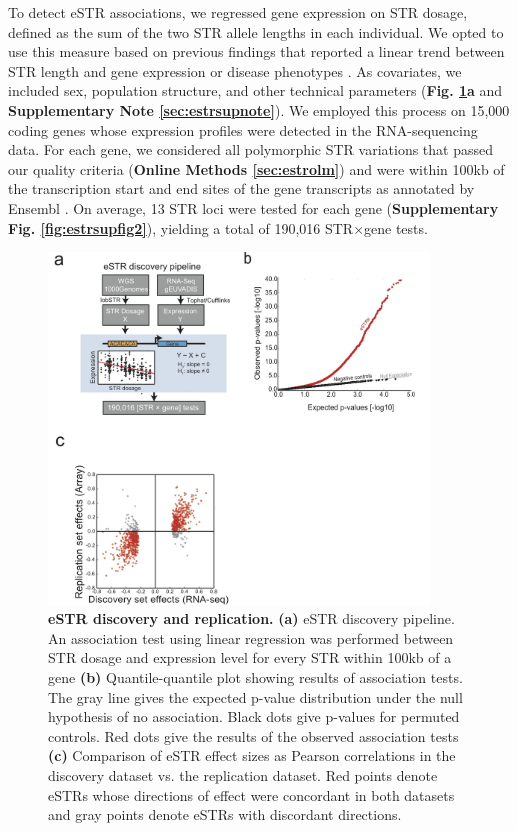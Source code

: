To detect eSTR associations, we regressed gene expression on STR dosage, defined as the sum of the two STR allele lengths in each individual. We opted to use this measure based on previous findings that reported a linear trend between STR length and gene expression \cite{GebhardtZankerBrandt1999,ShimajiriArimaTanimotoEtAl1999,ContenteDittmerKochEtAl2002} or disease phenotypes \cite{LaSpadaRolingHardingEtAl1992,DuyaoAmbroseMyersEtAl1993}. As covariates, we included sex, population structure, and other technical parameters (\textbf{Fig. \ref{fig:estrfig1}a} and \textbf{Supplementary Note \ref{sec:estrsupnote}}). We employed this process on 15,000 coding genes whose expression profiles were detected in the RNA-sequencing data. For each gene, we considered all polymorphic STR variations that passed our quality criteria (\textbf{Online Methods \ref{sec:estrolm}}) and were within 100kb of the transcription start and end sites of the gene transcripts as annotated by Ensembl \cite{FlicekAhmedAmodeEtAl2013}.  On average, 13 STR loci were tested for each gene (\textbf{Supplementary Fig. \ref{fig:estrsupfig2}}), yielding a total of 190,016 STR$\times$gene tests.  

\begin{figure}[h!]
\centering
\label{fig:estrfig1}
\includegraphics[width=0.9\textwidth]{Figures/Chapter4/Fig1}
\caption{\textbf{eSTR discovery and replication.} \textbf{(a)} eSTR discovery pipeline. An association test using linear regression was performed between STR dosage and expression level for every STR within 100kb of a gene \textbf{(b)} Quantile-quantile plot showing results of association tests. The gray line gives the expected p-value distribution under the null hypothesis of no association. Black dots give p-values for permuted controls. Red dots give the results of the observed association tests \textbf{(c)} Comparison of eSTR effect sizes as Pearson correlations in the discovery dataset vs. the replication dataset. Red points denote eSTRs whose directions of effect were concordant in both datasets and gray points denote eSTRs with discordant directions. }
\end{figure}

